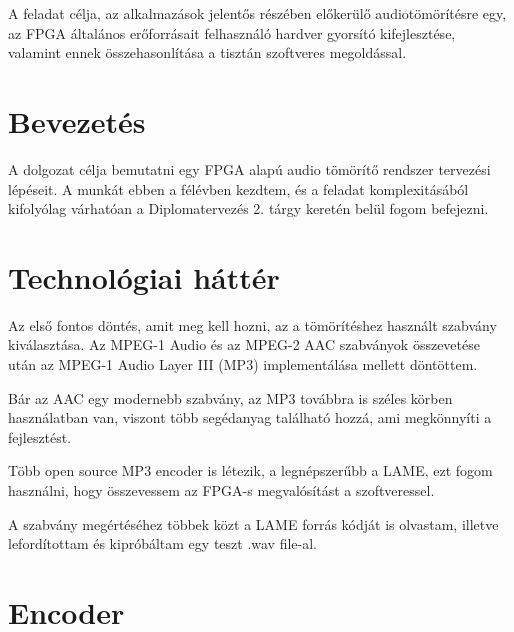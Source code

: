 \documentclass[12pt, a4paper]{article}
\begin{document}
A feladat célja, az alkalmazások jelentős részében előkerülő audiotömörítésre egy, az FPGA általános erőforrásait felhasználó hardver gyorsító kifejlesztése, valamint ennek összehasonlítása a tisztán szoftveres megoldással.

\newpage
\tableofcontents
\newpage

\section{Bevezetés}

A dolgozat célja bemutatni egy FPGA alapú audio tömörítő rendszer tervezési lépéseit. A munkát ebben a félévben kezdtem, és a feladat komplexitásából kifolyólag várhatóan a Diplomatervezés 2. tárgy keretén belül fogom befejezni.

\section{Technológiai háttér}

Az első fontos döntés, amit meg kell hozni, az a tömörítéshez használt szabvány kiválasztása.
Az MPEG-1 Audio és az MPEG-2 AAC szabványok összevetése után az MPEG-1 Audio Layer III (MP3) implementálása mellett döntöttem. 

Bár az AAC egy modernebb szabvány, az MP3 továbbra is széles körben használatban van, viszont több segédanyag található hozzá, ami megkönnyíti a fejlesztést.

Több open source MP3 encoder is létezik, a legnépszerűbb a LAME, ezt fogom használni, hogy összevessem az FPGA-s megvalósítást a szoftveressel.

A szabvány megértéséhez többek közt a LAME forrás kódját is olvastam, illetve lefordítottam és kipróbáltam egy teszt .wav file-al.


\section{Encoder}
\end{document}
